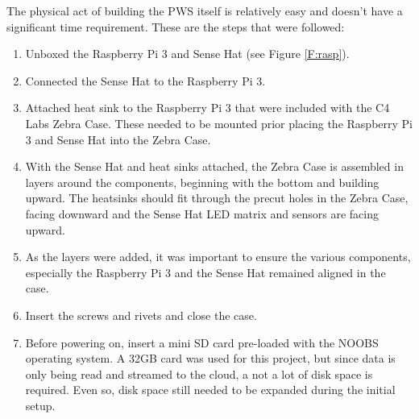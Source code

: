 \documentclass[sigconf]{acmart}
\begin{document}
The physical act of building the PWS itself is relatively easy and doesn't have a significant time requirement. These are the steps that were followed:
\begin{enumerate}
\item Unboxed the Raspberry Pi 3 and Sense Hat (see Figure \ref{F:rasp}).
\item Connected the Sense Hat to the Raspberry Pi 3.
\item Attached heat sink to the Raspberry Pi 3 that were included with the C4 Labs Zebra Case. These needed to be mounted prior placing the Raspberry Pi 3 and Sense Hat into the Zebra Case.
\item With the Sense Hat and heat sinks attached, the Zebra Case is assembled in layers around the components, beginning with the bottom and building upward. The heatsinks should fit through the precut holes in the Zebra Case, facing downward and the Sense Hat LED matrix and sensors are facing upward.
\item As the layers were added, it was important to ensure the various components, especially the Raspberry Pi 3 and the Sense Hat remained aligned in the case.
\item Insert the screws and rivets and close the case.
\item Before powering on, insert a mini SD card pre-loaded with the NOOBS operating system. A 32GB card was used for this project, but since data is only being read and streamed to the cloud, a not a lot of disk space is required. Even so, disk space still needed to be expanded during the initial setup.
\end{enumerate}

\end{document}
